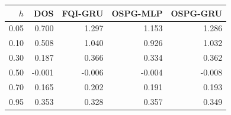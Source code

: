 \begin{tabular}{rrrrr}
\toprule
$h$ & DOS & FQI-GRU & OSPG-MLP & OSPG-GRU \\
\midrule
0.05 & 0.700 & 1.297 & 1.153 & 1.286 \\
0.10 & 0.508 & 1.040 & 0.926 & 1.032 \\
0.30 & 0.187 & 0.366 & 0.334 & 0.362 \\
0.50 & -0.001 & -0.006 & -0.004 & -0.008 \\
0.70 & 0.165 & 0.202 & 0.191 & 0.193 \\
0.95 & 0.353 & 0.328 & 0.357 & 0.349 \\
\bottomrule
\end{tabular}
